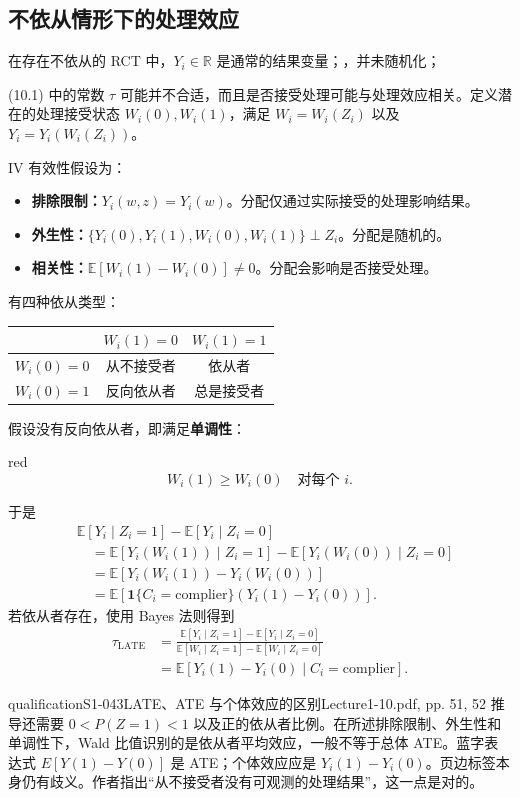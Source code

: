 \subsection{不依从情形下的处理效应}
在存在不依从的 RCT 中，$Y_i\in\mathbb R$ 是通常的结果变量；，并未随机化；

(10.1) 中的常数 $\tau$ 可能并不合适，而且是否接受处理可能与处理效应相关。定义潜在的处理接受状态 $W_i(0),W_i(1)$，满足 $W_i=W_i(Z_i)$ 以及 $Y_i=Y_i(W_i(Z_i))$。

IV 有效性假设为：
\begin{itemize}
 \item \textbf{排除限制：}$Y_i(w,z)=Y_i(w)$。分配仅通过实际接受的处理影响结果。
 \item \textbf{外生性：}$\{Y_i(0),Y_i(1),W_i(0),W_i(1)\}\perp Z_i$。分配是随机的。
 \item \textbf{相关性：}$\mathbb E[W_i(1)-W_i(0)]\ne0$。分配会影响是否接受处理。
\end{itemize}

有四种依从类型：
\begin{center}
\begin{tabular}{lcc}
 & $W_i(1)=0$ & $W_i(1)=1$\\\hline
 $W_i(0)=0$ & 从不接受者 & 依从者\\
 $W_i(0)=1$ & 反向依从者 & 总是接受者
\end{tabular}
\end{center}
假设没有反向依从者，即满足\textbf{单调性}：
\begin{inkblock}{red}
\[
 W_i(1)\ge W_i(0)\quad\text{对每个 }i.
\]
\end{inkblock}
于是
\begin{align*}
 &\mathbb E[Y_i\mid Z_i=1]-\mathbb E[Y_i\mid Z_i=0]\\
 &\quad=\mathbb E[Y_i(W_i(1))\mid Z_i=1]
 -\mathbb E[Y_i(W_i(0))\mid Z_i=0]\\
 &\quad=\mathbb E[Y_i(W_i(1))-Y_i(W_i(0))]\\
 &\quad=\mathbb E[\mathbf1\{C_i=\mathrm{complier}\}
 (Y_i(1)-Y_i(0))].
\end{align*}
若依从者存在，使用 Bayes 法则得到
\begin{align*}
 \tau_{\mathrm{LATE}}
 &=\frac{\mathbb E[Y_i\mid Z_i=1]-\mathbb E[Y_i\mid Z_i=0]}
 {\mathbb E[W_i\mid Z_i=1]-\mathbb E[W_i\mid Z_i=0]}\\
 &=\mathbb E[Y_i(1)-Y_i(0)\mid C_i=\mathrm{complier}].\tag{10.3}
\end{align*}
\begin{reviewnote}{qualification}{S1-043}{LATE、ATE 与个体效应的区别}{Lecture1-10.pdf, pp. 51, 52}
推导还需要 $0<P(Z=1)<1$ 以及正的依从者比例。在所述排除限制、外生性和单调性下，Wald 比值识别的是依从者平均效应，一般不等于总体 ATE。蓝字表达式 $E[Y(1)-Y(0)]$ 是 ATE；个体效应应是 $Y_i(1)-Y_i(0)$。页边标签本身仍有歧义。作者指出“从不接受者没有可观测的处理结果”，这一点是对的。
\end{reviewnote}


